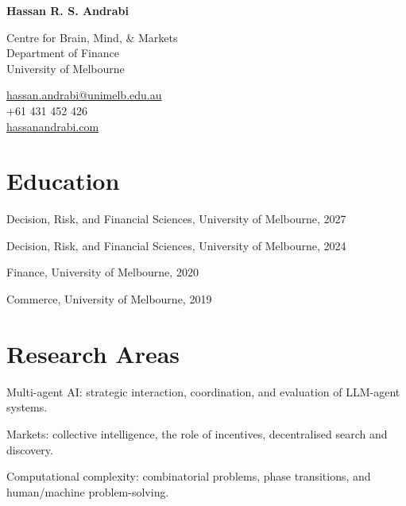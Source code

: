 \documentclass[11pt,letterpaper]{report}
\newcommand{\myname}{Hassan R. S. Andrabi}
\newcommand{\namefont}[1]{{\normalfont\bfseries\Huge{#1}}}
\newcommand{\listitemspace}{0.25em}
\renewenvironment{itemize}
{\begin{list}{}{\setlength{\leftmargin}{0em}
                \setlength{\parskip}{0em}
                \setlength{\itemsep}{\listitemspace}
                \setlength{\parsep}{\listitemspace}}}
{\end{list}}
\begin{document}
    \raggedright{}

    \namefont{\myname}

    \vspace{1em}
    \begin{minipage}[t]{0.700\textwidth}
        Centre for Brain, Mind, \& Markets \\
        Department of Finance \\
        University of Melbourne
    \end{minipage}
    \begin{minipage}[t]{0.295\textwidth}
        \raggedleft{}
        \href{mailto:hassan.andrabi@unimelb.edu.au}{hassan.andrabi@unimelb.edu.au} \\
        +61 431 452 426 \\
        \href{https://hassanandrabi.com}{hassanandrabi.com}
    \end{minipage}

    \section*{Education}

    \begin{tablist}
        \item[PhD] \tab{}Decision, Risk, and Financial Sciences, University of Melbourne, 2027
        \item[MCom] \tab{}Decision, Risk, and Financial Sciences, University of Melbourne, 2024
        \item[Hons] \tab{}Finance, University of Melbourne, 2020
        \item[BCom] \tab{}Commerce, University of Melbourne, 2019
    \end{tablist}

    \section*{Research Areas}

    \begin{itemize}
        \item Multi-agent AI: strategic interaction, coordination, and evaluation of LLM-agent systems.
        \item Markets: collective intelligence, the role of incentives, decentralised search and discovery.
        \item Computational complexity: combinatorial problems, phase transitions, and human/machine problem-solving.
    \end{itemize}
\end{document}

